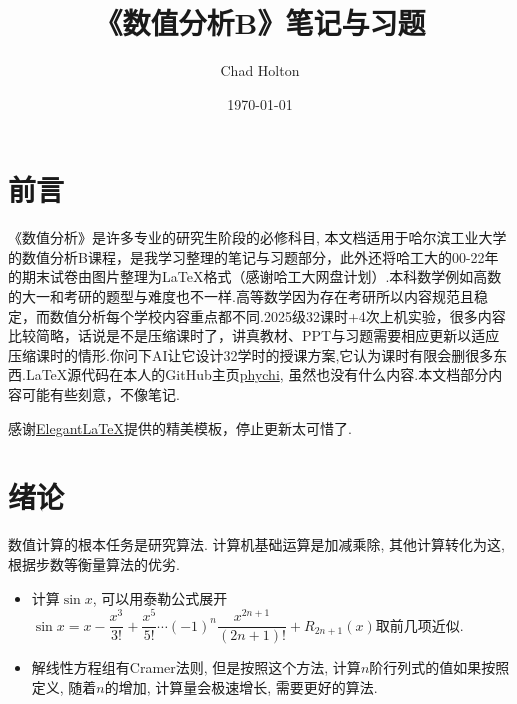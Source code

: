 \documentclass[lang=cn,newtx,12pt,scheme=chinese]{elegantbook}
\title{《数值分析B》笔记与习题}
\author{Chad Holton}
\institute{哈尔滨工业大学能源科学与工程学院}
\date{\today}
\begin{document}
\maketitle
\frontmatter

\tableofcontents

\mainmatter
\chapter*{前言}
《数值分析》是许多专业的研究生阶段的必修科目, 本文档适用于哈尔滨工业大学的数值分析B课程，是我学习整理的笔记与习题部分，此外还将哈工大的00-22年的期末试卷由图片整理为\LaTeX 格式（感谢哈工大网盘计划）.本科数学例如高数的大一和考研的题型与难度也不一样.高等数学因为存在考研所以内容规范且稳定，而数值分析每个学校内容重点都不同.2025级32课时+4次上机实验，很多内容比较简略，话说是不是压缩课时了，讲真教材、PPT与习题需要相应更新以适应压缩课时的情形.你问下AI让它设计32学时的授课方案,它认为课时有限会删很多东西.\LaTeX 源代码在本人的GitHub主页\href{https://github.com/phychi}{phychi}, 虽然也没有什么内容.本文档部分内容可能有些刻意，不像笔记.

感谢\href{https://github.com/ElegantLaTeX}{ElegantLaTeX}提供的精美模板，停止更新太可惜了.
\chapter{绪论}
数值计算的根本任务是研究算法. 计算机基础运算是加减乘除, 其他计算转化为这, 根据步数等衡量算法的优劣.
\begin{itemize}
	\item 计算$\sin x$, 可以用泰勒公式展开$\sin x=x-\dfrac{x^3}{3!}+\dfrac{x^5}{5!}\cdots(-1)^n\dfrac{x^{2n+1}}{(2n+1)!}+R_{2n+1}(x)$取前几项近似.
	\item 解线性方程组有Cramer法则, 但是按照这个方法, 计算$n$阶行列式的值如果按照定义, 随着$n$的增加, 计算量会极速增长, 需要更好的算法.
\end{itemize}
\end{document}

